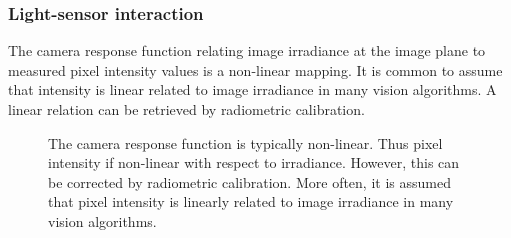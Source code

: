 \subsubsection{Light-sensor interaction}
The camera response function relating image irradiance at the image plane to measured pixel intensity values is a non-linear mapping. It is common to assume that intensity is linear related to image irradiance in many vision algorithms. A linear relation can be retrieved by radiometric calibration.
\begin{figure}[!htbp]
\centering
{}
\caption{The camera response function is typically non-linear. Thus pixel intensity if non-linear with respect to irradiance. However, this can be corrected by radiometric calibration. More often, it is assumed that pixel intensity is linearly related to image irradiance in many vision algorithms.}
\label{fig:light_sensor_interact}
\end{figure}

